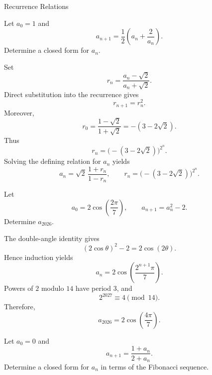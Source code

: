 \begin{expectedproblemgroup}{Recurrence Relations}
        \begin{expectedsubproblem}
            Let $a_0=1$ and
            \[
                a_{n+1}
                =
                \frac12\left(a_n+\frac{2}{a_n}\right).
            \]
            Determine a closed form for $a_n$.
        \end{expectedsubproblem}

        \begin{expectedsubsolution}
            Set
            \[
                r_n=\frac{a_n-\sqrt2}{a_n+\sqrt2}.
            \]
            Direct substitution into the recurrence gives
            \[
                r_{n+1}=r_n^2.
            \]
            Moreover,
            \[
                r_0
                =
                \frac{1-\sqrt2}{1+\sqrt2}
                =
                -(3-2\sqrt2).
            \]
            Thus
            \[
                r_n=\bigl(-(3-2\sqrt2)\bigr)^{2^n}.
            \]
            Solving the defining relation for $a_n$ yields
            \[
                \boxed{
                    a_n
                    =
                    \sqrt2\,
                    \frac{1+r_n}{1-r_n},
                    \qquad
                    r_n=\bigl(-(3-2\sqrt2)\bigr)^{2^n}
                }.
            \]
        \end{expectedsubsolution}

        \begin{expectedsubproblem}
            Let
            \[
                a_0=2\cos\left(\frac{2\pi}{7}\right),
                \qquad
                a_{n+1}=a_n^2-2.
            \]
            Determine $a_{2026}$.
        \end{expectedsubproblem}

        \begin{expectedsubsolution}
            The double-angle identity gives
            \[
                (2\cos\theta)^2-2=2\cos(2\theta).
            \]
            Hence induction yields
            \[
                a_n
                =
                2\cos\left(\frac{2^{n+1}\pi}{7}\right).
            \]
            Powers of $2$ modulo $14$ have period $3$, and
            \[
                2^{2027}\equiv4\pmod{14}.
            \]
            Therefore,
            \[
                \boxed{
                    a_{2026}=2\cos\left(\frac{4\pi}{7}\right)
                }.
            \]
        \end{expectedsubsolution}

        \begin{expectedsubproblem}
            Let $a_0=0$ and
            \[
                a_{n+1}=\frac{1+a_n}{2+a_n}.
            \]
            Determine a closed form for $a_n$ in terms of the Fibonacci
            sequence.
        \end{expectedsubproblem}


\end{expectedproblemgroup}
